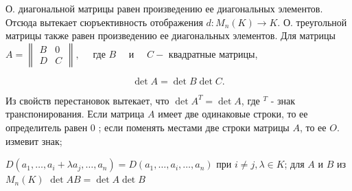 \documentclass[10pt]{article}
\begin{document}
О. диагональной матрицы равен произведению ее диагональных элементов. Отсюда вытекает сюръективность отображения $d: M_{n}(K) \rightarrow K$. О. треугольной матрицы также равен произведению ее диагональных элементов. Для матрицы $A=\left\|\begin{array}{ll}B & 0 \\ D & C\end{array}\right\|, \quad$ где $B \quad$ и $\quad C-$ квадратные матрицы,

\[
\operatorname{det} A=\operatorname{det} B \operatorname{det} C .
\]

Из свойств перестановок вытекает, что $\operatorname{det} A^{T}=\operatorname{det} A$, где ${ }^{T}$ - знак транспонирования. Если матрица $A$ имеет две одинаковые строки, то ее определитель равен 0 ; если поменять местами две строки матрицы $A$, то ее $O$. измевит знак;

$D\left(a_{1}, \ldots, a_{i}+\lambda a_{j}, \ldots, a_{n}\right)=D\left(a_{1}, \ldots, a_{i}, \ldots, a_{n}\right)$ при $i \neq j, \lambda \in K$; для $A$ и $B$ из $M_{n}(K)$ $\operatorname{det} A B=\operatorname{det} A \operatorname{det} B$
\end{document}
